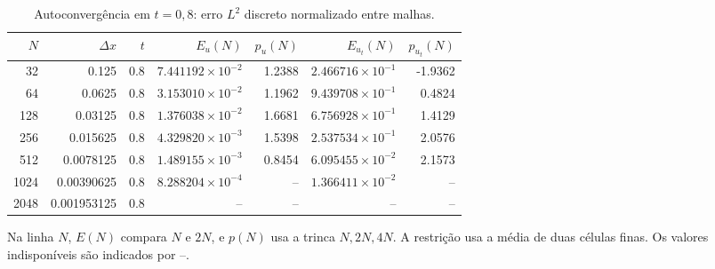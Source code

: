 \begin{table}[htbp]
\centering
\small
\caption{Autoconvergência em $t=0{,}8$: erro $L^2$ discreto normalizado entre malhas.}
\label{tab:autoconvergencia_combinado}
\setlength{\tabcolsep}{3pt}
\begin{tabular}{rrrrrrr}
\hline
$N$ & $\Delta x$ & $t$ & $E_u(N)$ & $p_u(N)$ & $E_{u_t}(N)$ & $p_{u_t}(N)$ \\
\hline
32 & 0.125 & 0.8 & $7.441192\times 10^{-2}$ & 1.2388 & $2.466716\times 10^{-1}$ & -1.9362 \\
64 & 0.0625 & 0.8 & $3.153010\times 10^{-2}$ & 1.1962 & $9.439708\times 10^{-1}$ & 0.4824 \\
128 & 0.03125 & 0.8 & $1.376038\times 10^{-2}$ & 1.6681 & $6.756928\times 10^{-1}$ & 1.4129 \\
256 & 0.015625 & 0.8 & $4.329820\times 10^{-3}$ & 1.5398 & $2.537534\times 10^{-1}$ & 2.0576 \\
512 & 0.0078125 & 0.8 & $1.489155\times 10^{-3}$ & 0.8454 & $6.095455\times 10^{-2}$ & 2.1573 \\
1024 & 0.00390625 & 0.8 & $8.288204\times 10^{-4}$ & -- & $1.366411\times 10^{-2}$ & -- \\
2048 & 0.001953125 & 0.8 & -- & -- & -- & -- \\
\hline
\end{tabular}
\par\smallskip
\parbox{0.98\linewidth}{\footnotesize Na linha $N$, $E(N)$ compara $N$ e $2N$,
e $p(N)$ usa a trinca $N,2N,4N$. A restrição usa a média de duas células finas.
Os valores indisponíveis são indicados por --.}
\end{table}
